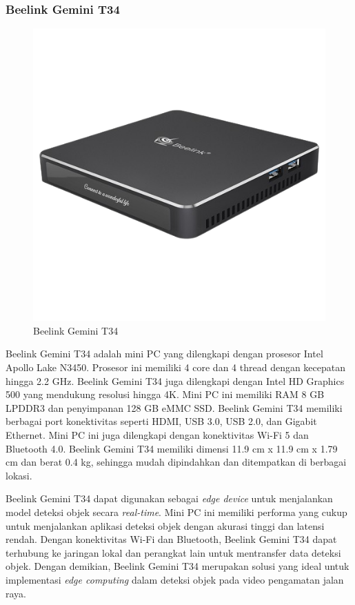\subsubsection{Beelink Gemini T34}
 \begin{figure}[H]
     \centering
     \includegraphics[scale=0.6]{gambar/bab2-beelink-gemini-t34.png}
     \caption{Beelink Gemini T34}
     \label{fig:beelinkgeminit34}
\end{figure}

Beelink Gemini T34 adalah mini PC yang dilengkapi dengan prosesor Intel Apollo Lake N3450. Prosesor ini memiliki 4 core dan 4 thread dengan kecepatan hingga 2.2 GHz. Beelink Gemini T34 juga dilengkapi dengan Intel HD Graphics 500 yang mendukung resolusi hingga 4K. Mini PC ini memiliki RAM 8 GB LPDDR3 dan penyimpanan 128 GB eMMC SSD. Beelink Gemini T34 memiliki berbagai port konektivitas seperti HDMI, USB 3.0, USB 2.0, dan Gigabit Ethernet. Mini PC ini juga dilengkapi dengan konektivitas Wi-Fi 5 dan Bluetooth 4.0. Beelink Gemini T34 memiliki dimensi 11.9 cm x 11.9 cm x 1.79 cm dan berat 0.4 kg, sehingga mudah dipindahkan dan ditempatkan di berbagai lokasi. \parencite*{beelinkGeminiT34}

Beelink Gemini T34 dapat digunakan sebagai \emph{edge device} untuk menjalankan model deteksi objek secara \emph{real-time}. Mini PC ini memiliki performa yang cukup untuk menjalankan aplikasi deteksi objek dengan akurasi tinggi dan latensi rendah. Dengan konektivitas Wi-Fi dan Bluetooth, Beelink Gemini T34 dapat terhubung ke jaringan lokal dan perangkat lain untuk mentransfer data deteksi objek. Dengan demikian, Beelink Gemini T34 merupakan solusi yang ideal untuk implementasi \emph{edge computing} dalam deteksi objek pada video pengamatan jalan raya.

